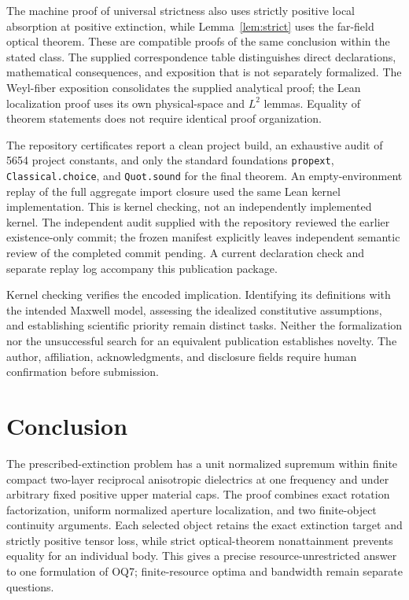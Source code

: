 \documentclass[11pt]{article}
\begin{document}
The machine proof of universal strictness also uses strictly positive local absorption at positive extinction, while Lemma~\ref{lem:strict} uses the far-field optical theorem. These are compatible proofs of the same conclusion within the stated class. The supplied correspondence table distinguishes direct declarations, mathematical consequences, and exposition that is not separately formalized. The Weyl-fiber exposition consolidates the supplied analytical proof; the Lean localization proof uses its own physical-space and $L^2$ lemmas. Equality of theorem statements does not require identical proof organization.

The repository certificates report a clean project build, an exhaustive audit of 5654 project constants, and only the standard foundations \texttt{propext}, \texttt{Classical.choice}, and \texttt{Quot.sound} for the final theorem. An empty-environment replay of the full aggregate import closure used the same Lean kernel implementation. This is kernel checking, not an independently implemented kernel. The independent audit supplied with the repository reviewed the earlier existence-only commit; the frozen manifest explicitly leaves independent semantic review of the completed commit pending. A current declaration check and separate replay log accompany this publication package.

Kernel checking verifies the encoded implication. Identifying its definitions with the intended Maxwell model, assessing the idealized constitutive assumptions, and establishing scientific priority remain distinct tasks. Neither the formalization nor the unsuccessful search for an equivalent publication establishes novelty. The author, affiliation, acknowledgments, and disclosure fields require human confirmation before submission.

\section{Conclusion}\label{sec:conclusion}
The prescribed-extinction problem has a unit normalized supremum within finite compact two-layer reciprocal anisotropic dielectrics at one frequency and under arbitrary fixed positive upper material caps. The proof combines exact rotation factorization, uniform normalized aperture localization, and two finite-object continuity arguments. Each selected object retains the exact extinction target and strictly positive tensor loss, while strict optical-theorem nonattainment prevents equality for an individual body. This gives a precise resource-unrestricted answer to one formulation of OQ7; finite-resource optima and bandwidth remain separate questions.
\end{document}
